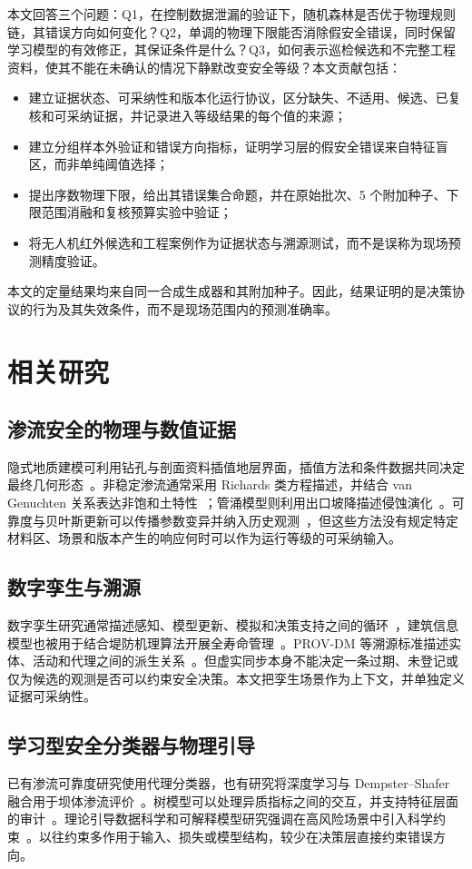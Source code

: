 \documentclass[10pt,twocolumn,a4paper]{ctexart}
\begin{document}
本文回答三个问题：Q1，在控制数据泄漏的验证下，随机森林是否优于物理规则链，其错误方向如何变化？Q2，单调的物理下限能否消除假安全错误，同时保留学习模型的有效修正，其保证条件是什么？Q3，如何表示巡检候选和不完整工程资料，使其不能在未确认的情况下静默改变安全等级？本文贡献包括：
\begin{itemize}
\item 建立证据状态、可采纳性和版本化运行协议，区分缺失、不适用、候选、已复核和可采纳证据，并记录进入等级结果的每个值的来源；
\item 建立分组样本外验证和错误方向指标，证明学习层的假安全错误来自特征盲区，而非单纯阈值选择；
\item 提出序数物理下限，给出其错误集合命题，并在原始批次、5 个附加种子、下限范围消融和复核预算实验中验证；
\item 将无人机红外候选和工程案例作为证据状态与溯源测试，而不是误称为现场预测精度验证。
\end{itemize}
本文的定量结果均来自同一合成生成器和其附加种子。因此，结果证明的是决策协议的行为及其失效条件，而不是现场范围内的预测准确率。

\section{相关研究}
\subsection{渗流安全的物理与数值证据}
隐式地质建模可利用钻孔与剖面资料插值地层界面，插值方法和条件数据共同决定最终几何形态~\cite{Wellmann2018,GemPy}。非稳定渗流通常采用 Richards 类方程描述，并结合 van Genuchten 关系表达非饱和土特性~\cite{Richards,Celia1990,vanGenuchten1980}；管涌模型则利用出口坡降描述侵蚀演化~\cite{vanBeek2015}。可靠度与贝叶斯更新可以传播参数变异并纳入历史观测~\cite{Schweckendiek,Roscoe,Baecher2003,Xu}，但这些方法没有规定特定材料区、场景和版本产生的响应何时可以作为运行等级的可采纳输入。

\subsection{数字孪生与溯源}
数字孪生研究通常描述感知、模型更新、模拟和决策支持之间的循环~\cite{Fuller2020}，建筑信息模型也被用于结合堤防机理算法开展全寿命管理~\cite{Hou}。PROV-DM 等溯源标准描述实体、活动和代理之间的派生关系~\cite{PROVDM}。但虚实同步本身不能决定一条过期、未登记或仅为候选的观测是否可以约束安全决策。本文把孪生场景作为上下文，并单独定义证据可采纳性。

\subsection{学习型安全分类器与物理引导}
已有渗流可靠度研究使用代理分类器，也有研究将深度学习与 Dempster--Shafer 融合用于坝体渗流评价~\cite{Xu,Chen}。树模型可以处理异质指标之间的交互，并支持特征层面的审计~\cite{Quinlan,Breiman,Hastie2009,LundbergLee}。理论引导数据科学和可解释模型研究强调在高风险场景中引入科学约束~\cite{Karpatne2017,Rudin2019}。以往约束多作用于输入、损失或模型结构，较少在决策层直接约束错误方向。
\end{document}
